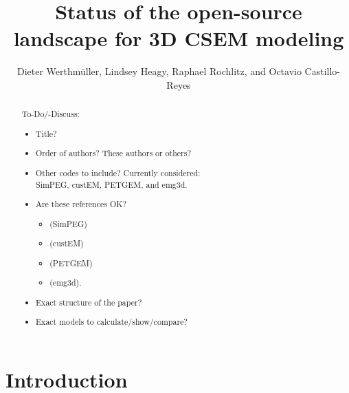 \documentclass[paper,twocolumn,twoside]{geophysics}
\begin{document}
\title{Status of the open-source landscape for 3D CSEM modeling}

\renewcommand{\thefootnote}{\fnsymbol{footnote}}


\address{
\footnotemark[1]TU Delft,
Building 23,
Stevinweg 1 / PO-box 5048,
2628 CN Delft,
E-mail: \href{mailto:D.Werthmuller@tudelft.nl}{D.Werthmuller@tudelft.nl};
}


\author{%
Dieter Werthmüller\footnotemark[1],
Lindsey Heagy,
Raphael Rochlitz, and
Octavio Castillo-Reyes
}

\footer{}

\maketitle

\begin{abstract} %
%
%
%
%
%
To-Do/-Discuss:
\begin{itemize}
  \item Title?
  \item Order of authors? These authors or others?
  \item Other codes to include? Currently considered:\\
    SimPEG, custEM, PETGEM, and emg3d.
  \item Are these references OK?
    \begin{itemize}
      \item \cite{CAG.15.Cockett} (SimPEG)
      \item \cite{GEO.18.Rochlitz} (custEM)
      \item \cite{GJI.19.CastilloReyes} (PETGEM)
      \item \cite{JOSS.19.Werthmuller} (emg3d).
    \end{itemize}
  \item Exact structure of the paper?
  \item Exact models to calculate/show/compare?
\end{itemize}
\end{abstract}

\section{Introduction}
\end{document}
